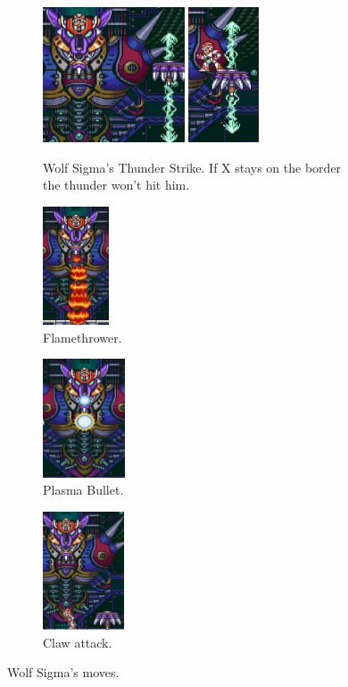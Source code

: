 \begin{figure}[htp]
	\centering
	\begin{subfigure}{\linewidth}
		\centering
		\includegraphics[height=4cm]{figures/X1/Sigma_stages/WolfSigma_thunder.jpg}
		\includegraphics[height=4cm]{figures/X1/Sigma_stages/WolfSigma_thunder_2.jpg}
		\caption{Wolf Sigma's Thunder Strike. If X stays on the border the thunder won't hit him.}
	\end{subfigure}
	\begin{subfigure}{0.25\linewidth}
		\centering
		\includegraphics[height=3.5cm]{figures/X1/Sigma_stages/WolfSigma_fire.jpg}
		\caption{Flamethrower.}
	\end{subfigure}
	\begin{subfigure}{0.25\linewidth}
		\centering
		\includegraphics[height=3.5cm]{figures/X1/Sigma_stages/WolfSigma_plasma.jpg}
		\caption{Plasma Bullet.}
	\end{subfigure}
	\begin{subfigure}{0.25\linewidth}
		\centering
		\includegraphics[height=3.5cm]{figures/X1/Sigma_stages/WolfSigma_claw.jpg}
		\caption{Claw attack.}
	\end{subfigure}
	\caption{Wolf Sigma's moves.}
\end{figure} 
